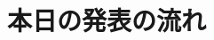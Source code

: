\documentclass[dvipdfmx, xcolor=svgnames]{beamer}
\theoremstyle{plain}
\theoremstyle{definition}
\theoremstyle{remark}
\begin{document}
    
    


\section{本日の発表の流れ}
\end{document}
